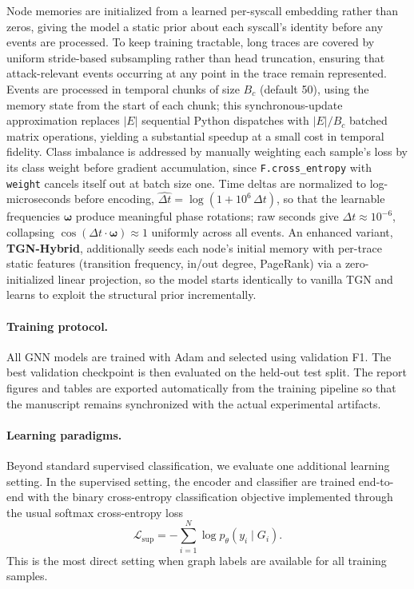 \documentclass{article}
\begin{document}
Node memories are initialized from a learned per-syscall embedding rather than zeros, giving the model a static prior about each syscall's identity before any events are processed. To keep training tractable, long traces are covered by uniform stride-based subsampling rather than head truncation, ensuring that attack-relevant events occurring at any point in the trace remain represented. Events are processed in temporal chunks of size $B_c$ (default 50), using the memory state from the start of each chunk; this synchronous-update approximation replaces $|E|$ sequential Python dispatches with $|E|/B_c$ batched matrix operations, yielding a substantial speedup at a small cost in temporal fidelity. Class imbalance is addressed by manually weighting each sample's loss by its class weight before gradient accumulation, since \texttt{F.cross\_entropy} with \texttt{weight} cancels itself out at batch size one. Time deltas are normalized to log-microseconds before encoding, $\hat{\Delta t} = \log(1 + 10^6\,\Delta t)$, so that the learnable frequencies $\boldsymbol{\omega}$ produce meaningful phase rotations; raw seconds give $\Delta t \approx 10^{-6}$, collapsing $\cos(\Delta t \cdot \boldsymbol{\omega}) \approx 1$ uniformly across all events. An enhanced variant, \textbf{TGN-Hybrid}, additionally seeds each node's initial memory with per-trace static features (transition frequency, in/out degree, PageRank) via a zero-initialized linear projection, so the model starts identically to vanilla TGN and learns to exploit the structural prior incrementally.

\paragraph{Training protocol.}
All GNN models are trained with Adam and selected using validation F1. The best validation checkpoint is then evaluated on the held-out test split. The report figures and tables are exported automatically from the training pipeline so that the manuscript remains synchronized with the actual experimental artifacts.

\paragraph{Learning paradigms.}
Beyond standard supervised classification, we evaluate one additional learning setting. In the supervised setting, the encoder and classifier are trained end-to-end with the binary cross-entropy classification objective implemented through the usual softmax cross-entropy loss
\[
\mathcal{L}_{\mathrm{sup}} = - \sum_{i=1}^{N} \log p_\theta(y_i \mid G_i).
\]
This is the most direct setting when graph labels are available for all training samples.
\end{document}

